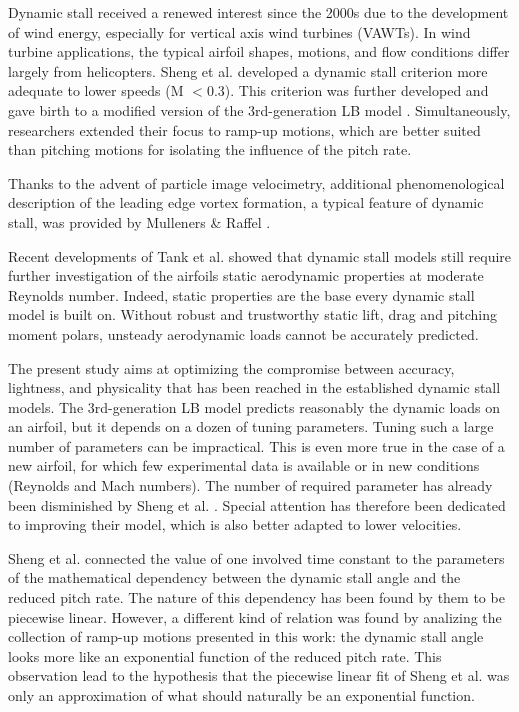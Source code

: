 Dynamic stall received a renewed interest since the 2000s due to the development of wind energy, especially for vertical axis wind turbines (VAWTs). In wind turbine applications, the typical airfoil shapes, motions, and flow conditions differ largely from helicopters. Sheng et al. developed a dynamic stall criterion more adequate to lower speeds (M $<0.3$). This criterion was further developed \cite{sheng_improved_2007} and gave birth to a modified version of the 3rd-generation LB model \cite{sheng_modified_2008}. Simultaneously, researchers extended their focus to ramp-up motions, which are better suited than pitching motions for isolating the influence of the pitch rate. 

Thanks to the advent of particle image velocimetry, additional phenomenological description of the leading edge vortex formation, a typical feature of dynamic stall, was provided by Mulleners \& Raffel \cite{mulleners_dynamic_2013}. 

Recent developments of Tank et al. \cite{tank_possibility_2017} showed that dynamic stall models still require further investigation of the airfoils static aerodynamic properties at moderate Reynolds number. Indeed, static properties are the base every dynamic stall model is built on. Without robust and trustworthy static lift, drag and pitching moment polars, unsteady aerodynamic loads cannot be accurately predicted. 


The present study aims at optimizing the compromise between accuracy, lightness, and physicality that has been reached in the established dynamic stall models. 
The 3rd-generation LB model predicts reasonably the dynamic loads on an airfoil, but it depends on a dozen of tuning parameters. 
Tuning such a large number of parameters can be impractical. This is even more true in the case of a new airfoil, for which few experimental data is available or in new conditions (Reynolds and Mach numbers). The number of required parameter has already been disminished by Sheng et al. \cite{sheng_modified_2008}. Special attention has therefore been dedicated to improving their model, which is also better adapted to lower velocities.  

Sheng et al. \cite{sheng_improved_2007} connected the value of one involved time constant to the parameters of the mathematical dependency between the dynamic stall angle and the reduced pitch rate. 
The nature of this dependency has been found by them to be piecewise linear. 
However, a different kind of relation was found by analizing the collection of ramp-up motions presented in this work: the dynamic stall angle looks more like an exponential function of the reduced pitch rate. 
This observation lead to the hypothesis that the piecewise linear fit of Sheng et al. was only an approximation of what should naturally be an exponential function. 

